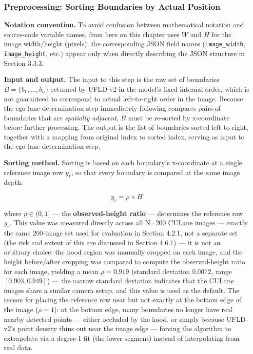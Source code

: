 \documentclass[12pt,a4paper]{report}
\begin{document}
\subsubsection*{Preprocessing: Sorting Boundaries by Actual Position}

\textbf{Notation convention.} To avoid confusion between mathematical notation and source-code variable names, from here on this chapter uses $W$ and $H$ for the image width/height (pixels); the corresponding JSON field names (\texttt{image\_width}, \texttt{image\_height}, etc.) appear only when directly describing the JSON structure in Section 3.3.3.

\textbf{Input and output.} The input to this step is the raw set of boundaries $B = \{b_1, \ldots, b_n\}$ returned by UFLD-v2 in the model's fixed internal order, which is not guaranteed to correspond to actual left-to-right order in the image. Because the ego-lane-determination step immediately following compares pairs of boundaries that are \textit{spatially adjacent}, $B$ must be re-sorted by x-coordinate before further processing. The output is the list of boundaries sorted left to right, together with a mapping from original index to sorted index, serving as input to the ego-lane-determination step.

\textbf{Sorting method.} Sorting is based on each boundary's x-coordinate at a single reference image row $y_r$, so that every boundary is compared at the same image depth:

\[
y_r = \rho \times H
\]

where $\rho \in (0,1]$ --- the \textbf{observed-height ratio} --- determines the reference row $y_r$. This value was measured directly across all N=200 CULane images --- exactly the same 200-image set used for evaluation in Section 4.2.1, not a separate set (the risk and extent of this are discussed in Section 4.6.1) --- it is not an arbitrary choice: the hood region was manually cropped on each image, and the height before/after cropping was compared to compute the observed-height ratio for each image, yielding a mean $\rho = 0.919$ (standard deviation $0.0072$, range $[0.903, 0.949]$) --- the narrow standard deviation indicates that the CULane images share a similar camera setup, and this value is used as the default. The reason for placing the reference row near but not exactly at the bottom edge of the image ($\rho=1$): at the bottom edge, many boundaries no longer have real nearby detected points --- either occluded by the hood, or simply because UFLD-v2's point density thins out near the image edge --- forcing the algorithm to extrapolate via a degree-1 fit (the lower segment) instead of interpolating from real data.
\end{document}
